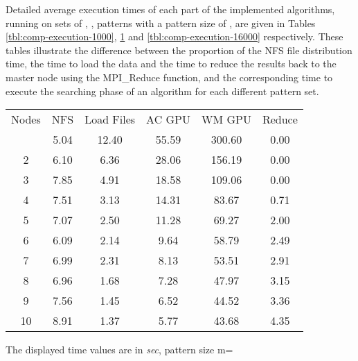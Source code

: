 \documentclass{ws-ijait}
\begin{document}
Detailed average execution times of each part of the implemented algorithms, running on sets of , ,  patterns with a pattern size of , are given in Tables \ref{tbl:comp-execution-1000}, \ref{tbl:comp-execution-8000} and \ref{tbl:comp-execution-16000} respectively. These tables illustrate the difference between the proportion of the NFS file distribution time, the time to load the data and the time to reduce the results back to the master node using the MPI\_Reduce function, and the corresponding time to execute the searching phase of an algorithm for each different pattern set.

\begin{table}[h]
{\begin{tabular}{@{}c |ccccc@{}} \toprule
Nodes & NFS & Load Files & AC GPU & WM GPU & Reduce\\
\colrule
1 & 5.04 & 12.40 & 55.59 & 300.60 & 0.00\\
2 & 6.10 & 6.36 & 28.06 & 156.19 & 0.00\\
3 & 7.85 & 4.91 & 18.58 & 109.06 & 0.00\\
4 & 7.51 & 3.13 & 14.31 & 83.67 & 0.71\\
5 & 7.07 & 2.50 & 11.28 & 69.27 & 2.00\\
6 & 6.09 & 2.14 & 9.64 & 58.79 & 2.49\\
7 & 6.99 & 2.31 & 8.13 & 53.51 & 2.91\\
8 & 6.96 & 1.68 & 7.28 & 47.97 & 3.15\\
9 & 7.56 & 1.45 & 6.52 & 44.52 & 3.36\\
10 & 8.91 & 1.37 & 5.77 & 43.68 & 4.35\\
\hline
\end{tabular}}
\begin{tabnote}
The displayed time values are in \textit{sec}, pattern size m=
\end{tabnote}
\label{tbl:comp-execution-8000}
\end{table}
\end{document}
